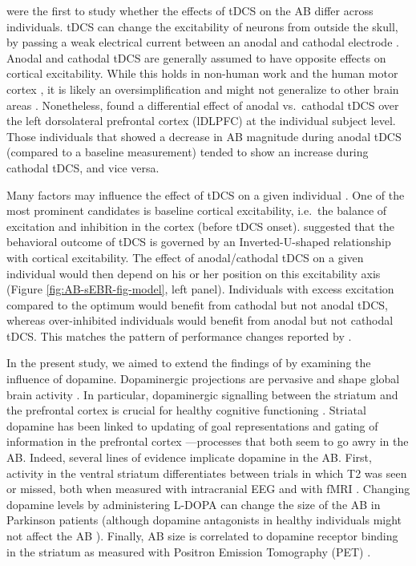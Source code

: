 \documentclass[11pt,english,]{memoir}
\begin{document}
\textcite{London2015} were the first to study whether the effects of tDCS on the AB differ across individuals. tDCS can change the excitability of neurons from outside the skull, by passing a weak electrical current between an anodal and cathodal electrode \autocite{Gebodh2019a}. Anodal and cathodal tDCS are generally assumed to have opposite effects on cortical excitability. While this holds in non-human work \autocites{Purpura1965}{Bindman1964} and the human motor cortex \autocites{Nitsche2000}{Nitsche2001}, it is likely an oversimplification \autocite{Liu2018} and might not generalize to other brain areas \autocites{Bestmann2014}{Parkin2015}. Nonetheless, \textcite{London2015} found a differential effect of anodal vs.~cathodal tDCS over the left dorsolateral prefrontal cortex (lDLPFC) at the individual subject level. Those individuals that showed a decrease in AB magnitude during anodal tDCS (compared to a baseline measurement) tended to show an increase during cathodal tDCS, and vice versa.

Many factors may influence the effect of tDCS on a given individual \autocites{Krause2014}{Li2015b}. One of the most prominent candidates is baseline cortical excitability, i.e.~the balance of excitation and inhibition in the cortex (before tDCS onset). \textcite{Krause2013} suggested that the behavioral outcome of tDCS is governed by an Inverted-U-shaped relationship with cortical excitability. The effect of anodal/cathodal tDCS on a given individual would then depend on his or her position on this excitability axis (Figure \ref{fig:AB-sEBR-fig-model}, left panel). Individuals with excess excitation compared to the optimum would benefit from cathodal but not anodal tDCS, whereas over-inhibited individuals would benefit from anodal but not cathodal tDCS. This matches the pattern of performance changes reported by \textcite{London2015}.

In the present study, we aimed to extend the findings of \textcite{London2015} by examining the influence of dopamine. Dopaminergic projections are pervasive and shape global brain activity \autocites{Schultz2007}{Bjorklund2007}. In particular, dopaminergic signalling between the striatum and the prefrontal cortex is crucial for healthy cognitive functioning \autocites{Nieoullon2002}{Robbins2009}. Striatal dopamine has been linked to updating of goal representations and gating of information in the prefrontal cortex \autocites{Cohen2004}{Cools2011}---processes that both seem to go awry in the AB. Indeed, several lines of evidence implicate dopamine in the AB. First, activity in the ventral striatum differentiates between trials in which T2 was seen or missed, both when measured with intracranial EEG \autocite{Slagter2017} and with fMRI \autocite{Slagter2010}. Changing dopamine levels by administering L-DOPA can change the size of the AB in Parkinson patients \autocite{Slagter2016a} (although dopamine antagonists in healthy individuals might not affect the AB \autocite{Gibbs2007}). Finally, AB size is correlated to dopamine receptor binding in the striatum as measured with Positron Emission Tomography (PET) \autocite{Slagter2012}.
\end{document}
